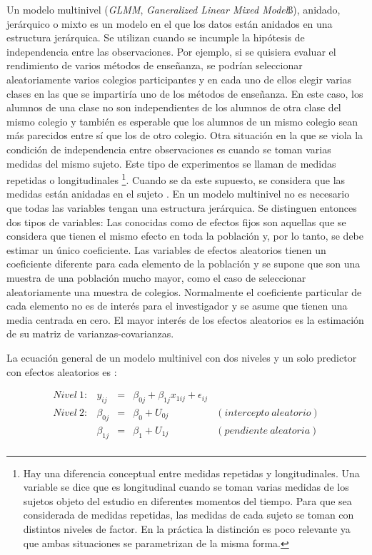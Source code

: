 \documentclass[
  12pt,
  a4paper,
  extrafontsizes,
  onecolumn,
  openright,
  table]{memoir}
\begin{document}
Un modelo multinivel (\emph{\gls{GLMM}}, \emph{Ganeralized Linear Mixed
Model}ß), anidado, jerárquico o mixto es un modelo en el que los datos
están anidados en una estructura jerárquica. Se utilizan cuando se
incumple la hipótesis de independencia entre las observaciones. Por
ejemplo, si se quisiera evaluar el rendimiento de varios métodos de
enseñanza, se podrían seleccionar aleatoriamente varios colegios
participantes y en cada uno de ellos elegir varias clases en las que se
impartiría uno de los métodos de enseñanza. En este caso, los alumnos de
una clase no son independientes de los alumnos de otra clase del mismo
colegio y también es esperable que los alumnos de un mismo colegio sean
más parecidos entre sí que los de otro colegio. Otra situación en la que
se viola la condición de independencia entre observaciones es cuando se
toman varias medidas del mismo sujeto. Este tipo de experimentos se
llaman de medidas repetidas o longitudinales \footnote{Hay una
  diferencia conceptual entre medidas repetidas y longitudinales. Una
  variable se dice que es longitudinal cuando se toman varias medidas de
  los sujetos objeto del estudio en diferentes momentos del tiempo. Para
  que sea considerada de medidas repetidas, las medidas de cada sujeto
  se toman con distintos niveles de factor. En la práctica la distinción
  es poco relevante ya que ambas situaciones se parametrizan de la misma
  forma.}. Cuando se da este supuesto, se considera que las medidas
están anidadas en el sujeto \autocite[ver][]{Liu2202}. En un modelo
multinivel no es necesario que todas las variables tengan una estructura
jerárquica. Se distinguen entonces dos tipos de variables: Las conocidas
como de efectos fijos son aquellas que se considera que tienen el mismo
efecto en toda la población y, por lo tanto, se debe estimar un único
coeficiente. Las variables de efectos aleatorios tienen un coeficiente
diferente para cada elemento de la población y se supone que son una
muestra de una población mucho mayor, como el caso de seleccionar
aleatoriamente una muestra de colegios. Normalmente el coeficiente
particular de cada elemento no es de interés para el investigador y se
asume que tienen una media centrada en cero. El mayor interés de los
efectos aleatorios es la estimación de su matriz de
varianzas-covarianzas.

La ecuación general de un modelo multinivel con dos niveles y un solo
predictor con efectos aleatorios es \autocite[ver][pp.~40]{chen2021}:

\[
\begin{aligned}
Nivel\ 1: & y_{ij}     & = & \beta_{0j} + \beta_{1j}x_{1ij} + \epsilon_{ij} \\
Nivel\ 2: & \beta_{0j} & = & \beta_{0} + U_{0j} & (intercepto\ aleatorio) \\
          & \beta_{1j} & = & \beta_{1} + U_{1j} & (pendiente\ aleatoria) \\
\end{aligned}
\]
\end{document}

